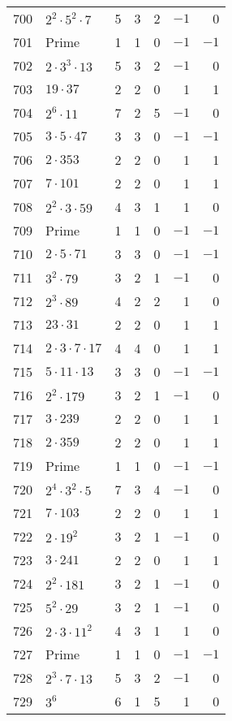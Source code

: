 \documentclass[12pt]{article}
\begin{document}
\begin{tabular}{|r|l|r|r|r|r|r|}
700 & $2^2 \cdot 5^2 \cdot 7$ & 5 & 3 & 2 & $-1$ & 0 \\
701 & Prime & 1 & 1 & 0 & $-1$ & $-1$ \\
702 & $2 \cdot 3^3 \cdot 13$ & 5 & 3 & 2 & $-1$ & 0 \\
703 & $19 \cdot 37$ & 2 & 2 & 0 & 1 & 1 \\
704 & $2^6 \cdot 11$ & 7 & 2 & 5 & $-1$ & 0 \\
705 & $3 \cdot 5 \cdot 47$ & 3 & 3 & 0 & $-1$ & $-1$ \\
706 & $2 \cdot 353$ & 2 & 2 & 0 & 1 & 1 \\
707 & $7 \cdot 101$ & 2 & 2 & 0 & 1 & 1 \\
708 & $2^2 \cdot 3 \cdot 59$ & 4 & 3 & 1 & 1 & 0 \\
709 & Prime & 1 & 1 & 0 & $-1$ & $-1$ \\
710 & $2 \cdot 5 \cdot 71$ & 3 & 3 & 0 & $-1$ & $-1$ \\
711 & $3^2 \cdot 79$ & 3 & 2 & 1 & $-1$ & 0 \\
712 & $2^3 \cdot 89$ & 4 & 2 & 2 & 1 & 0 \\
713 & $23 \cdot 31$ & 2 & 2 & 0 & 1 & 1 \\
714 & $2 \cdot 3 \cdot 7 \cdot 17$ & 4 & 4 & 0 & 1 & 1 \\
715 & $5 \cdot 11 \cdot 13$ & 3 & 3 & 0 & $-1$ & $-1$ \\
716 & $2^2 \cdot 179$ & 3 & 2 & 1 & $-1$ & 0 \\
717 & $3 \cdot 239$ & 2 & 2 & 0 & 1 & 1 \\
718 & $2 \cdot 359$ & 2 & 2 & 0 & 1 & 1 \\
719 & Prime & 1 & 1 & 0 & $-1$ & $-1$ \\
720 & $2^4 \cdot 3^2 \cdot 5$ & 7 & 3 & 4 & $-1$ & 0 \\
721 & $7 \cdot 103$ & 2 & 2 & 0 & 1 & 1 \\
722 & $2 \cdot 19^2$ & 3 & 2 & 1 & $-1$ & 0 \\
723 & $3 \cdot 241$ & 2 & 2 & 0 & 1 & 1 \\
724 & $2^2 \cdot 181$ & 3 & 2 & 1 & $-1$ & 0 \\
725 & $5^2 \cdot 29$ & 3 & 2 & 1 & $-1$ & 0 \\
726 & $2 \cdot 3 \cdot 11^2$ & 4 & 3 & 1 & 1 & 0 \\
727 & Prime & 1 & 1 & 0 & $-1$ & $-1$ \\
728 & $2^3 \cdot 7 \cdot 13$ & 5 & 3 & 2 & $-1$ & 0 \\
729 & $3^6$ & 6 & 1 & 5 & 1 & 0 \\

\end{tabular}
\end{document}
